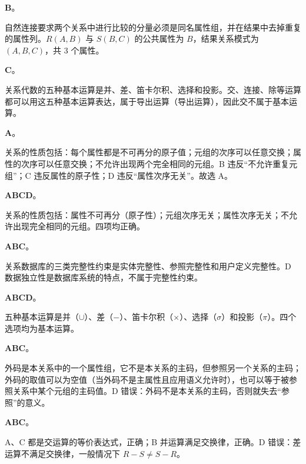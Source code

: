 \documentclass[a4paper,11pt]{article}
\begin{document}
\q \textbf{B}。\begin{analysis}自然连接要求两个关系中进行比较的分量必须是同名属性组，并在结果中去掉重复的属性列。$R(A,B)$ 与 $S(B,C)$ 的公共属性为 $B$，结果关系模式为 $(A,B,C)$，共 3 个属性。\end{analysis}

\q \textbf{C}。\begin{analysis}关系代数的五种基本运算是并、差、笛卡尔积、选择和投影。交、连接、除等运算都可以用这五种基本运算表达，属于导出运算（导出运算），因此交不属于基本运算。\end{analysis}

\q \textbf{A}。\begin{analysis}关系的性质包括：每个属性都是不可再分的原子值；元组的次序可以任意交换；属性的次序可以任意交换；不允许出现两个完全相同的元组。B 违反“不允许重复元组”；C 违反属性的原子性；D 违反“属性次序无关”。故选 A。\end{analysis}


\q \textbf{ABCD}。\begin{analysis}关系的性质包括：属性不可再分（原子性）；元组次序无关；属性次序无关；不允许出现完全相同的元组。四项均正确。\end{analysis}

\q \textbf{ABC}。\begin{analysis}关系数据库的三类完整性约束是实体完整性、参照完整性和用户定义完整性。D 数据独立性是数据库系统的特点，不属于完整性约束。\end{analysis}

\q \textbf{ABCD}。\begin{analysis}五种基本运算是并（$\cup$）、差（$-$）、笛卡尔积（$\times$）、选择（$\sigma$）和投影（$\pi$）。四个选项均为基本运算。\end{analysis}

\q \textbf{ABC}。\begin{analysis}外码是本关系中的一个属性组，它不是本关系的主码，但参照另一个关系的主码；外码的取值可以为空值（当外码不是主属性且应用语义允许时），也可以等于被参照关系中某个元组的主码值。D 错误：外码不是本关系的主码，否则就失去“参照”的意义。\end{analysis}

\q \textbf{ABC}。\begin{analysis}A、C 都是交运算的等价表达式，正确；B 并运算满足交换律，正确。D 错误：差运算不满足交换律，一般情况下 $R-S\ne S-R$。\end{analysis}
\end{document}
